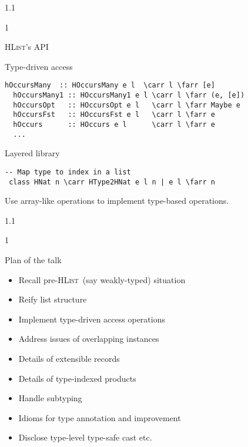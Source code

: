 \documentclass{slides}
\newenvironment{myslide}{\begin{slide}\color{Blue}\begin{boxedminipage}{1.1\hsize}\begin{boxedminipage}{1\hsize}\color{Black}
\vspace{-170\in}
}{%
\smallskip
\end{boxedminipage}
\end{boxedminipage}
\end{slide}}
\newenvironment{myslide}{\begin{slide}
}{%
\end{slide}}
\newenvironment{myslide}{\begin{slide}\color{White}\begin{boxedminipage}{1.1\hsize}\color{Black}
\vspace{-170\in}
}{%
\smallskip
\end{boxedminipage}
\end{slide}}
\newcommand{\littleskip}{\topsep8pt \parskip8pt \partopsep8pt}
\newcommand{\header}[1]{{\large \color{Red} #1}}
\newcommand{\blau}[1]{{\vspace{-50\in}\normalsize \color{Blue} #1}}
\newcommand{\HList}{\textsc{HList}}
\newcommand{\farr}{\ensuremath{\to}}
\newcommand{\carr}{\ensuremath{\Rightarrow}}
\begin{document}
\begin{myslide}

\header{\HList's API}

\vspace{-66\in}

\blau{Type-driven access}

\medskip

\begin{Verbatim}[fontfamily=courier,fontsize=\small,commandchars=\\\{\}]
  hOccursMany  :: HOccursMany e l  \carr l \farr [e]
  hOccursMany1 :: HOccursMany1 e l \carr l \farr (e, [e])
  hOccursOpt   :: HOccursOpt e l   \carr l \farr Maybe e
  hOccursFst   :: HOccursFst e l   \carr l \farr e
  hOccurs      :: HOccurs e l      \carr l \farr e
  ...
\end{Verbatim}

\vspace{-66\in}

\blau{Layered library}

\medskip

\begin{Verbatim}[fontfamily=courier,fontsize=\small,commandchars=\\\{\}]
 -- Map type to index in a list
 class HNat n \carr HType2HNat e l n | e l \farr n
\end{Verbatim}

{

\small

Use array-like operations to implement type-based operations.

}

\end{myslide}






\begin{myslide}

\header{Plan of the talk}

{\small

\littleskip\begin{itemize}
\item Recall pre-\HList\ (say weakly-typed) situation 
\item Reify list structure
\item Implement type-driven access operations
\item Address issues of overlapping instances
\item Details of extensible records
\item Details of type-indexed products
\item Handle subtyping
\item Idioms for type annotation and improvement
\item Disclose type-level type-safe cast etc.
\end{itemize}

}

\end{myslide}
\end{document}
